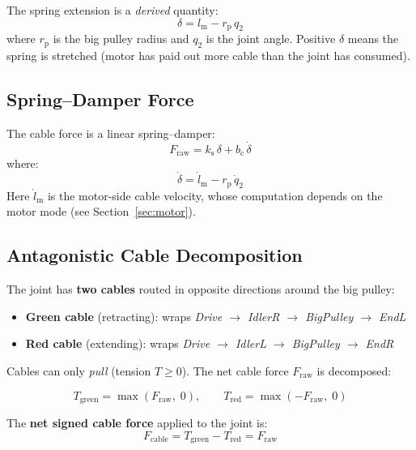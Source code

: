 \documentclass[11pt,a4paper]{article}
\newcommand{\rp}{r_{\mathrm{p}}}
\newcommand{\lm}{l_{\mathrm{m}}}
\newcommand{\lmd}{\dot{l}_{\mathrm{m}}}
\newcommand{\ks}{k_{\mathrm{s}}}
\newcommand{\bc}{b_{\mathrm{c}}}
\begin{document}
The spring extension is a \emph{derived} quantity:
\begin{equation}
\boxed{\delta = \lm - \rp \, q_2}
\label{eq:delta}
\end{equation}
where $\rp$ is the big pulley radius and $q_2$ is the joint angle.  Positive $\delta$ means the spring is stretched (motor has paid out more cable than the joint has consumed).


\subsection{Spring--Damper Force}

The cable force is a linear spring--damper:
\begin{equation}
\boxed{F_{\mathrm{raw}} = \ks \, \delta + \bc \, \dot{\delta}}
\label{eq:Fraw}
\end{equation}
where:
\begin{equation}
    \dot{\delta} = \lmd - \rp \, \dot{q}_2
    \label{eq:delta_dot}
\end{equation}
Here $\lmd$ is the motor-side cable velocity, whose computation depends on the motor mode (see Section~\ref{sec:motor}).


\subsection{Antagonistic Cable Decomposition}
\label{sec:antagonistic}

The joint has \textbf{two cables} routed in opposite directions around the big pulley:

\begin{itemize}[leftmargin=2em]
    \item \textbf{Green cable} (retracting): wraps \emph{Drive $\to$ IdlerR $\to$ BigPulley $\to$ EndL}
    \item \textbf{Red cable} (extending): wraps \emph{Drive $\to$ IdlerL $\to$ BigPulley $\to$ EndR}
\end{itemize}

Cables can only \emph{pull} (tension $T \geq 0$).  The net cable force $F_{\mathrm{raw}}$ is decomposed:

\begin{equation}
\boxed{
    T_{\mathrm{green}} = \max(F_{\mathrm{raw}},\; 0), \qquad
    T_{\mathrm{red}} = \max(-F_{\mathrm{raw}},\; 0)
}
\label{eq:tensions}
\end{equation}

The \textbf{net signed cable force} applied to the joint is:
\begin{equation}
    F_{\mathrm{cable}} = T_{\mathrm{green}} - T_{\mathrm{red}} = F_{\mathrm{raw}}
\label{eq:Fnet}
\end{equation}
\end{document}
